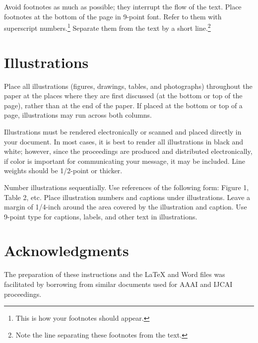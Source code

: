 \documentclass[letterpaper]{article}
\begin{document}
Avoid footnotes as much as possible; they interrupt the flow of
the text. 
Place footnotes at the bottom of the page in 9-point font.  Refer to
them with superscript numbers.\footnote{This is how your footnotes
should appear.} Separate them from the text by a short
line.\footnote{Note the line separating these footnotes from the
text.} 

\section{Illustrations}

Place all illustrations (figures, drawings, tables, and photographs)
throughout the paper at the places where they are first discussed (at the bottom
or top of the page), rather than at the end of the paper. If placed at the bottom or top of
a page, illustrations may run across both columns.

Illustrations must be rendered electronically or scanned and placed
directly in your document. In most cases, it is best to render all illustrations
in black and white; however, since the proceedings are produced and distributed electronically, if color
is important for communicating your message, it may be included. Line weights should
be 1/2-point or thicker.

Number illustrations sequentially. Use references of the following
form: Figure 1, Table 2, etc. Place illustration numbers and captions
under illustrations. Leave a margin of 1/4-inch around the area
covered by the illustration and caption.  Use 9-point type for
captions, labels, and other text in illustrations.

\section{Acknowledgments}

The preparation of these instructions and the \LaTeX{} and Word files was 
facilitated by borrowing from similar documents used for AAAI and IJCAI proceedings.










\end{document}
